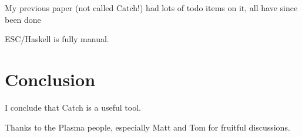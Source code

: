 \documentclass[preprint]{sigplanconf}
\begin{document}
My previous paper (not called Catch!) had lots of todo items on it, all have since been done

ESC/Haskell is fully manual.


\section{Conclusion}
\label{sec:conclusion}

I conclude that Catch is a useful tool.




%

\acks

Thanks to the Plasma people, especially Matt and Tom for fruitful discussions.



\end{document}

